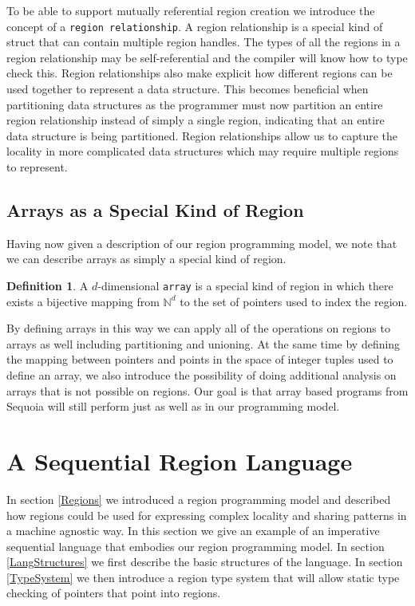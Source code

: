 \documentclass{article}
\theoremstyle{definition}
\newtheorem{definition}{Definition}
\begin{document}
\noindent
To be able to support mutually referential region creation we introduce the concept
of a {\tt region relationship}.  A region relationship is a special kind of struct that
can contain multiple region handles.  The types of all the regions in a region relationship
may be self-referential and the compiler will know how to type check this.  Region
relationships also make explicit how different regions can be used together to represent
a data structure.  This becomes beneficial when partitioning data structures as the
programmer must now partition an entire region relationship instead of simply a single
region, indicating that an entire data structure is being partitioned.  Region relationships
allow us to capture the locality in more complicated data structures which may require
multiple regions to represent.

\subsection{Arrays as a Special Kind of Region \label{Arrays}}
\noindent
Having now given a description of our region programming model, we note that we
can describe arrays as simply a special kind of region.

\begin{definition}
A $d$-dimensional {\tt array} is a special kind of region in which there exists
a bijective mapping from $\mathbb{N}^d$ to the set of pointers used to index
the region.
\end{definition}

\noindent
By defining arrays in this way we can apply all of the operations on regions to
arrays as well including partitioning and unioning.  At the same time by defining
the mapping between pointers and points in the space of integer tuples used to
define an array, we also introduce the possibility of doing additional analysis
on arrays that is not possible on regions.  Our goal is that array based
programs from Sequoia will still perform just as well as in our programming model.\\

\pagebreak


\section{A Sequential Region Language \label{Sequential}}
\noindent
In section \ref{Regions} we introduced a region programming model and described
how regions could be used for expressing complex locality and sharing patterns in a
machine agnostic way.  In this section we give an example of an imperative sequential language that
embodies our region programming model.  In section \ref{LangStructures} we first
describe the basic structures of the language.  In section \ref{TypeSystem} we
then introduce a region type system that will allow static type checking of pointers
that point into regions.
\end{document}
